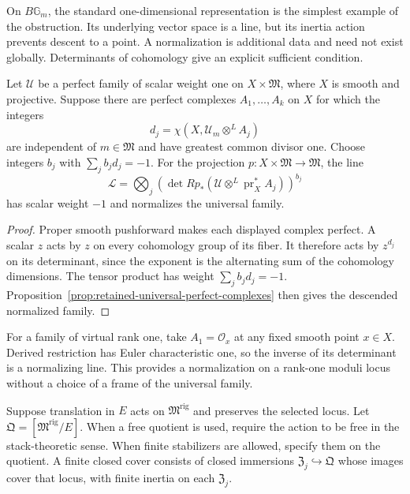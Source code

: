 On $B\mathbb G_m$, the standard one-dimensional representation is
the simplest example of the obstruction.  Its underlying vector
space is a line, but its inertia action prevents descent to a point.
A normalization is additional data and need not exist globally.
Determinants of cohomology give an explicit sufficient condition.

\begin{proposition}
\label{k3:prop:scalar-normalization}
Let $\mathcal U$ be a perfect family of scalar weight one on
$X\times\mathfrak M$, where $X$ is smooth and projective.  Suppose
there are perfect complexes $A_1,\ldots,A_k$ on $X$ for which the
integers
\[
d_j=\chi(X,\mathcal U_m\otimes^L A_j)
\]
are independent of $m\in\mathfrak M$ and have greatest common
divisor one.  Choose integers $b_j$ with $\sum_jb_jd_j=-1$.
For the projection $p:X\times\mathfrak M\to\mathfrak M$, the line
\[
\mathcal L=\bigotimes_j
\left(\det Rp_*(\mathcal U\otimes^L\operatorname{pr}_X^*A_j)
\right)^{b_j}
\]
has scalar weight $-1$ and normalizes the universal family.
\end{proposition}

\begin{proof}
Proper smooth pushforward makes each displayed complex perfect.
A scalar $z$ acts by $z$ on every cohomology group of its fiber.
It therefore acts by $z^{d_j}$ on its determinant, since the
exponent is the alternating sum of the cohomology dimensions.
The tensor product has weight $\sum_jb_jd_j=-1$.
Proposition~\ref{prop:retained-universal-perfect-complexes} then
gives the descended normalized family.
\end{proof}

For a family of virtual rank one, take $A_1=\mathcal O_x$ at any
fixed smooth point $x\in X$.  Derived restriction has Euler
characteristic one, so the inverse of its determinant is a
normalizing line.  This provides a normalization on a rank-one
moduli locus without a choice of a frame of the universal family.

\begin{definition}
\label{def:retained-e-translation-rigidification-datum}
\label{def:retained-closed-substack-datum}
Suppose translation in $E$ acts on $\mathfrak M^{\mathrm{rig}}$ and
preserves the selected locus.  Let
$\mathfrak Q=[\mathfrak M^{\mathrm{rig}}/E]$.
When a free quotient is used, require the action to be free in the
stack-theoretic sense.  When finite stabilizers are allowed, specify
them on the quotient.  A finite closed cover consists of closed
immersions $\mathfrak Z_j\hookrightarrow\mathfrak Q$ whose images
cover that locus, with finite inertia on each $\mathfrak Z_j$.
\end{definition}

